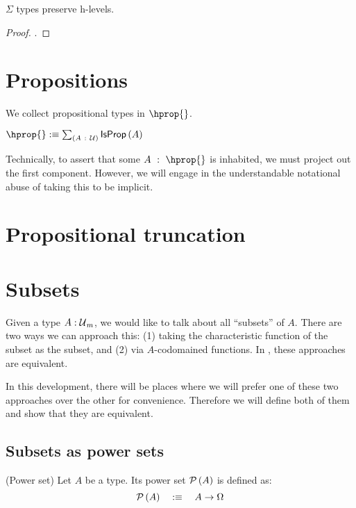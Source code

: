 \begin{prop}\label{isOfHLevelSigma}
  $\Sigma$ types preserve h-levels.
\end{prop}
\begin{proof}
  .
\end{proof}

\section{Propositions}

We collect propositional types in $\hprop{}$.

\begin{defn}\label{omega}
  $\hprop{} \is \sigmaty{A}{\univ}{\isaprop{A}}$
\end{defn}

Technically, to assert that some $A~:~\hprop{}$ is inhabited, we must project out the
first component. However, we will engage in the understandable notational abuse of taking
this to be implicit.

\section{Propositional truncation}

\section{Subsets}

Given a type $A : \mathcal{U}{}_m$, we would like to talk about all ``subsets'' of $A$. There
are two ways we can approach this: (1) taking the characteristic function of the subset as
the subset, and (2) via $A$-codomained functions. In \UF{}, these approaches are
equivalent.

In this development, there will be places where we will prefer one of these two approaches
over the other for convenience. Therefore we will define both of them and show that they
are equivalent.

\subsection{Subsets as power sets}

\begin{defn}(Power set)\label{defn:pow}
  Let $A$ be a type. Its power set $\mathcal{P}\left(A\right)$ is defined as:
  \begin{equation*}
    \mathcal{P}\left(A\right) \quad:\equiv\quad A \rightarrow \Omega
  \end{equation*}
\end{defn}

